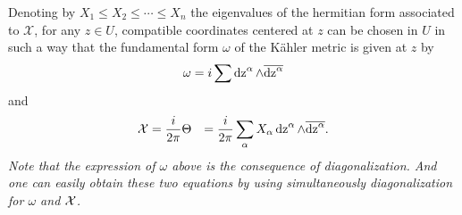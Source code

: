\documentclass[lang=en,12pt]{beautybook}
\begin{document}
Denoting by $X_1 \leqslant X_2 \leqslant \cdots \leqslant X_n$ the eigenvalues
of the hermitian form associated to $\mathcal{X}$, for any $z \in U$,
compatible coordinates centered at $z$ can be chosen in $U$ in such a way that
the fundamental form $\omega$ of the K\"ahler metric is given at $z$ by
\[ \omega = i \sum \operatorname{dz}^{\alpha} \wedge \overline{\operatorname{dz}^{\alpha}} \]
and
\begin{eqnarray*}
  \mathcal{X} & = \dfrac{i}{2 \pi} \Theta & = \frac{i}{2 \pi} \sum_{\alpha}
  X_{\alpha} \operatorname{dz}^{\alpha} \wedge \overline{\operatorname{dz}^{\alpha}} .
\end{eqnarray*}
\textit{Note that the expression of $\omega$ above is the consequence of diagonalization. And one can easily obtain these two equations by using simultaneously  diagonalization for $\omega$ and ${\mathcal X}$.}
\end{document}
